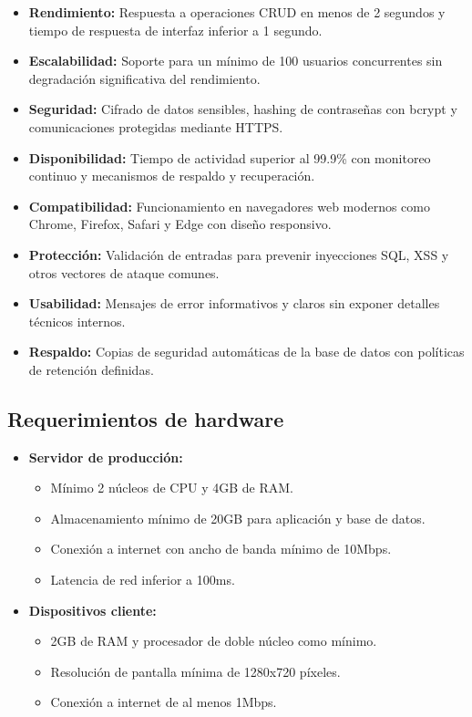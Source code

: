 \documentclass[journal]{IEEEtran}
\begin{document}
\begin{itemize}
  \item \textbf{Rendimiento:} Respuesta a operaciones CRUD en menos de 2 segundos y tiempo de respuesta de interfaz inferior a 1 segundo.

  \item \textbf{Escalabilidad:} Soporte para un mínimo de 100 usuarios concurrentes sin degradación significativa del rendimiento.

  \item \textbf{Seguridad:} Cifrado de datos sensibles, hashing de contraseñas con bcrypt y comunicaciones protegidas mediante HTTPS.

  \item \textbf{Disponibilidad:} Tiempo de actividad superior al 99.9\% con monitoreo continuo y mecanismos de respaldo y recuperación.

  \item \textbf{Compatibilidad:} Funcionamiento en navegadores web modernos como Chrome, Firefox, Safari y Edge con diseño responsivo.

  \item \textbf{Protección:} Validación de entradas para prevenir inyecciones SQL, XSS y otros vectores de ataque comunes.

  \item \textbf{Usabilidad:} Mensajes de error informativos y claros sin exponer detalles técnicos internos.

  \item \textbf{Respaldo:} Copias de seguridad automáticas de la base de datos con políticas de retención definidas.
\end{itemize}

\subsection{Requerimientos de hardware}

\begin{itemize}
  \item \textbf{Servidor de producción:}
    \begin{itemize}
      \item Mínimo 2 núcleos de CPU y 4GB de RAM.
      \item Almacenamiento mínimo de 20GB para aplicación y base de datos.
      \item Conexión a internet con ancho de banda mínimo de 10Mbps.
      \item Latencia de red inferior a 100ms.
    \end{itemize}

  \item \textbf{Dispositivos cliente:}
    \begin{itemize}
      \item 2GB de RAM y procesador de doble núcleo como mínimo.
      \item Resolución de pantalla mínima de 1280x720 píxeles.
      \item Conexión a internet de al menos 1Mbps.
    \end{itemize}
\end{itemize}
\end{document}
